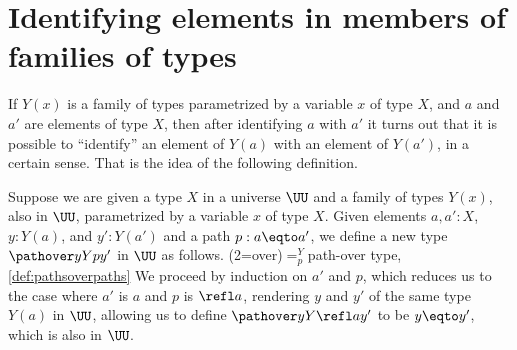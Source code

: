 \section{Identifying elements in members of families of types}

If $Y(x)$ is a family of types parametrized by a variable $x$ of type $X$, and $a$ and $a'$ are elements of type $X$, then after identifying $a$
with $a'$ it turns out that it is possible to ``identify'' an element of $Y(a)$ with an element of $Y(a')$, in a certain sense.  That is the
idea of the following definition.

\begin{definition}\label{def:pathsoverpaths}
  Suppose we are given a type $X$ in a universe $\UU$ and a family of types $Y(x)$, also in $\UU$, parametrized by a variable $x$ of type $X$.
  Given elements $a,a':X$, $y:Y(a)$, and
  $y':Y(a')$ and a path $p : a \eqto a'$,
  we define a new type $\pathover y Y p {y'}$ in $\UU$ as follows.%
  \glossary(2=over){$=^Y_p$}{path-over type, \cref{def:pathsoverpaths}}
  We proceed by induction on $a'$ and $p$, which reduces us to the case where $a'$ is $a$ and $p$ is $\refl a$,
  rendering $y$ and $y'$ of the same type $Y(a)$ in $\UU$, allowing us to define
  $\pathover y Y {\refl a} {y'}$ to be $y \eqto y'$, which is also in $\UU$.
\end{definition}

